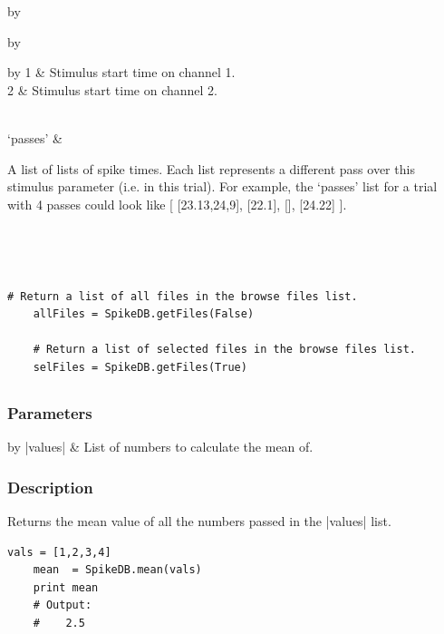 \documentclass{report}
\begin{document}
\begin{table}[h]
\begin{center}
\begin{tabular}{by}
\begin{minipage}[t]{0.5\columnwidth}
\begin{tabular}{by}
					\begin{tabular}{by}
						1 & Stimulus start time on channel 1.\\
												2 & Stimulus start time on channel 2.\\
					\end{tabular}\\
										`passes' & \begin{minipage}[t]{1.0\columnwidth} A list of lists of spike times.  Each list represents a different pass over this stimulus parameter (i.e. in this trial). For example, the `passes' list for a trial with 4 passes could look like [ [23.13,24,9], [22.1], [], [24.22] ]. \end{minipage}\\
			\end{tabular}
		\end{minipage}\\
			\end{tabular}
	\label{tblGetFiles}
	\end{center}
\end{table}
\begin{lstlisting}[caption=Example]
	# Return a list of all files in the browse files list.
	allFiles = SpikeDB.getFiles(False)

	# Return a list of selected files in the browse files list.
	selFiles = SpikeDB.getFiles(True)
\end{lstlisting}


\clearpage
\subsection{}
\subsubsection{Parameters}
\begin{table}[h]
\begin{center}
\begin{tabular}{by}
		|values| & List of numbers to calculate the mean of.\\
	\end{tabular}
\end{center}
\end{table}
\subsubsection{Description}
Returns the mean value of all the numbers passed in the |values| list.
\begin{lstlisting}[caption=Example]
	vals = [1,2,3,4]
	mean  = SpikeDB.mean(vals)
	print mean
	# Output:
	#    2.5
\end{lstlisting}
\end{document}

